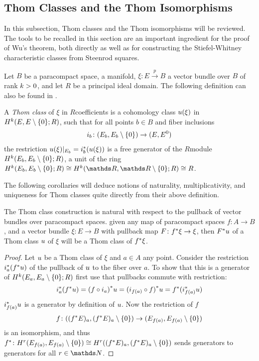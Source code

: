 \subsection{Thom Classes and the Thom Isomorphisms}\label{sec:thomclasses}
In this subsection, Thom classes and the Thom isomorphisms will be
reviewed. The tools to be recalled in this section are an important
ingredient for the proof of Wu's theorem, both directly as well as for
constructing the Stiefel-Whitney characteristic classes from Steenrod
squares.

Let $B$ be a paracompact space, \forexample a manifold,
$\xi\colon E\xrightarrow{p} B$ a vector bundle over $B$ of rank $k>0$,
and let $R$ be a principal ideal domain.
The following definition can \forexample also be found in
\cite[p.~441]{hatcher}.
\begin{Def}
  A \emph{Thom class} of $\xi$ in $R$\nbd{}coefficients is a
  cohomology class ${u}(\xi)$ in $H^{k}(E, {E}\setminus\{0\}; R)$,
  such that for all points $b\in B$ and fiber inclusions
  \begin{gather*}
    i_b\colon (E_b, {E_b}\setminus\{0\}) \to (E, {E}^0)
  \end{gather*}
  the restriction ${u}(\xi)|_{E_b} = {i}^*_b ({u}(\xi))$ is a
  free generator of the $R$\nbd{}module $H^{k}(E_b, {E_b}\setminus\{0\}; R)$,
  \idest a unit
  of the ring
  $\H^{\rkk}(\spherepair{E_b};R)\cong \H^{\rkk}(\spherepair{\R}; R)\cong R$.
\end{Def}

The following corollaries will deduce notions of naturality,
multiplicativity, and uniqueness for Thom classes quite directly from
their above definition.

\begin{Cor}\label{cor:thomclsnatural}
  The Thom class construction is natural with respect to the pullback
  of vector bundles over paracompact spaces.
  \Idest given any map of paracompact spaces $f\colon A\to B$, and a
  vector bundle $\xi\colon E\to B$ with pullback map
  $F\colon{f}^*\xi\to\xi$,
  then ${F}^* u$ of a Thom class $u$ of $\xi$ will
  be a Thom class of ${f}^* \xi$.
  \begin{proof}
    Let $u$ be a Thom class of $\xi$ and $a\in A$ any point.
    Consider the restriction ${i}^*_a({f}^* u)$
    of the pullback of $u$ to the fiber over $a$. To show that this
    is a generator of $H^{k}(E_a, {E_a}\setminus\{0\};R)$ first use that
    pullbacks commute with restriction:
    \begin{gather*}
      {i}^*_a({f}^* u)
      = {(f\circ i_a)}^* u
      = {(i_{f(a)}\circ f)}^* u
      = {f}^* ({i}^*_{f(a)} u)
    \end{gather*}
    ${i}^*_{f(a)} u$ is a generator by definition of $u$.
    Now the restriction of $f$
    \begin{gather*}
      f\colon (({f}^* E)_a, {({f}^* E)_a}\setminus\{0\}) \to (E_{f(a)}, {E_{f(a)}}\setminus\{0\})
    \end{gather*}
    is an isomorphism, and thus
    ${f}^*\colon H^r(E_{f(a)}, {E_{f(a)}}\setminus\{0\})
    \cong H^r(({f}^* E)_a, {({f}^* E)_a}\setminus\{0\})$
    sends generators to generators for all $r\in\Nat$.
  \end{proof}
\end{Cor}

